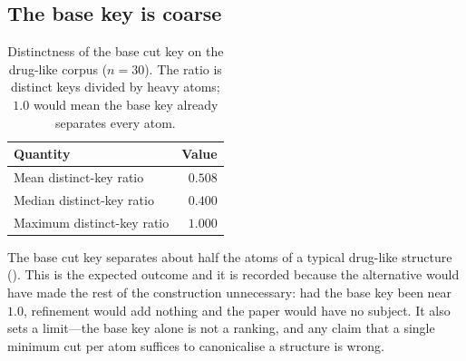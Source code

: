 \documentclass[11pt,twocolumn,a4paper]{article}
\theoremstyle{crthm}
\theoremstyle{definition}
\theoremstyle{remark}
\begin{document}
\subsection{The base key is coarse}

\begin{table}[htbp]
\centering\small
\caption{Distinctness of the base cut key on the drug-like corpus
($n=30$). The ratio is distinct keys divided by heavy atoms; $1.0$ would
mean the base key already separates every atom.}
\label{tab:coarse}
\begin{tabular}{@{}lr@{}}
\toprule
Quantity & Value\\
\midrule
Mean distinct-key ratio & $0.508$\\
Median distinct-key ratio & $0.400$\\
Maximum distinct-key ratio & $1.000$\\
\bottomrule
\end{tabular}
\end{table}

The base cut key separates about half the atoms of a typical drug-like
structure (). This is the expected outcome and it is
recorded because the alternative would have made the rest of the
construction unnecessary: had the base key been near $1.0$, refinement
would add nothing and the paper would have no subject. It also sets a
limit---the base key alone is not a ranking, and any claim that a single
minimum cut per atom suffices to canonicalise a structure is wrong.
\end{document}
